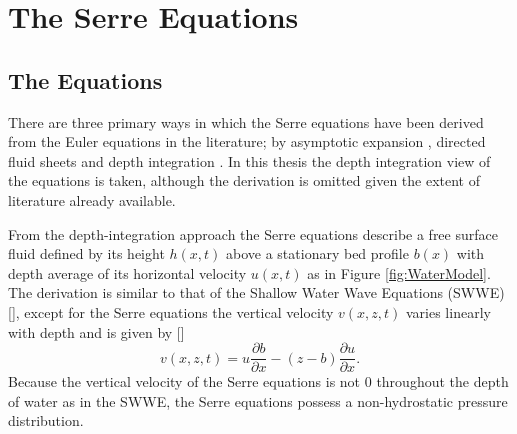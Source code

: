 
\chapter{The Serre Equations}
\label{chp:Serreeqns}










\section{The Equations}
There are three primary ways in which the Serre equations have been derived from the Euler equations in the literature; by asymptotic expansion \cite{Serre-F-1953-857,Bonneton-Lannes-2009-16601}, directed fluid sheets \cite{Green-Naghdi-1976-237} and depth integration \cite{Su-Gardener-1969-536,Zoppou-2014}. In this thesis the depth integration view of the equations is taken, although the derivation is omitted given the extent of literature already available. 

From the depth-integration approach the Serre equations describe a free surface fluid defined by its height $h(x,t)$ above a stationary bed profile $b(x)$ with depth average of its horizontal velocity $u(x,t)$ as in Figure \ref{fig:WaterModel}. The derivation is similar to that of the Shallow Water Wave Equations (SWWE) [], except for the Serre equations the vertical velocity $v(x,z,t)$ varies linearly with depth and is given by []
\begin{equation}
v(x,z,t) = u \frac{\partial b}{\partial x} - (z - b) \frac{\partial u}{\partial x}.
\label{eqn:VertVelSerre}
\end{equation}
Because the vertical velocity of the Serre equations is not $0$ throughout the depth of water as in the SWWE, the Serre equations possess a non-hydrostatic pressure distribution.

